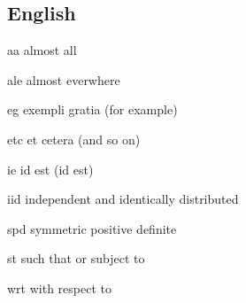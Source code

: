 \documentclass[english,a4paper,DIV=12,parskip=full,oneside]{scrartcl}
\begin{document}
        \subsection{English}
        \begin{commandlist}
            \item[aa] almost all \codeExample{\aa}
            \item[ale] almost everwhere \codeExample{\ale}
            \item[eg] exempli gratia (for example) \codeExample{\eg}
            \item[etc] et cetera (and so on) \codeExample{\etc}
            \item[ie] id est (id est) \codeExample{\ie}
            \item[iid] independent and identically distributed \codeExample{\iid}
            \item[spd] symmetric positive definite \codeExample{\spd}
            \item[st] such that or subject to \codeExample{\st}
            \item[wrt] with respect to \codeExample{\wrt}
        \end{commandlist}
\end{document}
